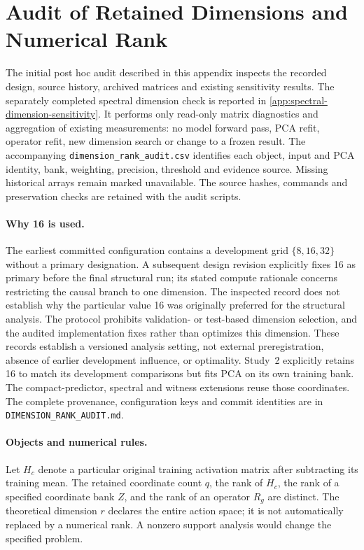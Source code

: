 \section{Audit of Retained Dimensions and Numerical Rank}
\label{app:dimension-rank-audit}
The initial post hoc audit described in this appendix inspects the recorded design, source history, archived matrices and existing sensitivity results. The separately completed spectral dimension check is reported in \cref{app:spectral-dimension-sensitivity}. It performs only read-only matrix diagnostics and aggregation of existing measurements: no model forward pass, PCA refit, operator refit, new dimension search or change to a frozen result. The accompanying \texttt{dimension\_rank\_audit.csv} identifies each object, input and PCA identity, bank, weighting, precision, threshold and evidence source. Missing historical arrays remain marked unavailable. The source hashes, commands and preservation checks are retained with the audit scripts.

\paragraph{Why 16 is used.}
The earliest committed configuration contains a development grid $\{8,16,32\}$ without a primary designation. A subsequent design revision explicitly fixes 16 as primary before the final structural run; its stated compute rationale concerns restricting the causal branch to one dimension. The inspected record does not establish why the particular value 16 was originally preferred for the structural analysis. The protocol prohibits validation- or test-based dimension selection, and the audited implementation fixes rather than optimizes this dimension. These records establish a versioned analysis setting, not external preregistration, absence of earlier development influence, or optimality. Study~2 explicitly retains 16 to match its development comparisons but fits PCA on its own training bank. The compact-predictor, spectral and witness extensions reuse those coordinates. The complete provenance, configuration keys and commit identities are in \texttt{DIMENSION\_RANK\_AUDIT.md}.

\paragraph{Objects and numerical rules.}
Let $H_c$ denote a particular original training activation matrix after subtracting its training mean. The retained coordinate count $q$, the rank of $H_c$, the rank of a specified coordinate bank $Z$, and the rank of an operator $R_g$ are distinct. The theoretical dimension $r$ declares the entire action space; it is not automatically replaced by a numerical rank. A nonzero support analysis would change the specified problem.

